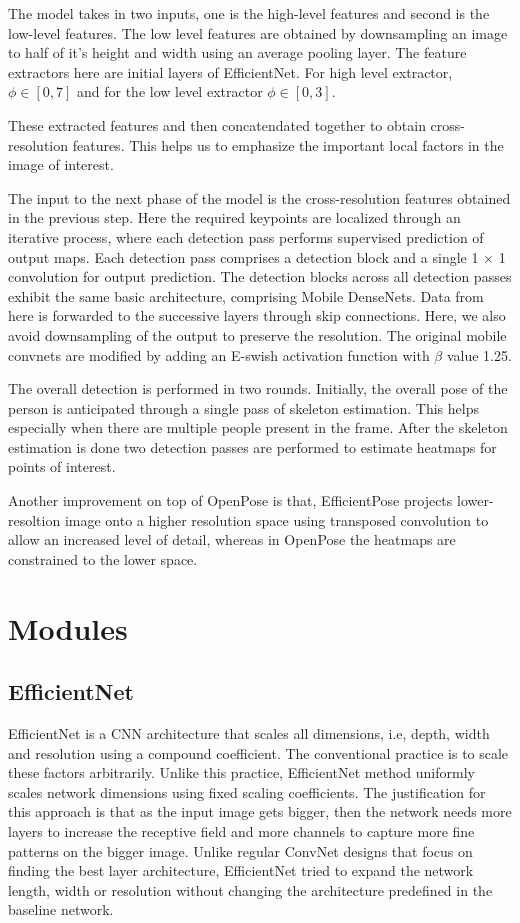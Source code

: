 \documentclass{fisatprojectfinal}
\begin{document}
The model takes in two inputs, one is the high-level features and second is the low-level features.
The low level features are obtained by downsampling an image to half of it's height and width using an average pooling layer.
The feature extractors here are initial layers of EfficientNet. For high level extractor, $\phi \in [0,7]$ and 
for the low level extractor $\phi \in [0,3]$.
\par
These extracted features and then concatendated together to obtain cross-resolution features.
This helps us to emphasize the important local factors in the image of interest.
\par
The input to the next phase of the model is the cross-resolution features obtained in the previous step.
Here the required keypoints are localized through an iterative process, where each
detection pass performs supervised prediction of output maps.
Each detection pass comprises a detection block
and a single 1 × 1 convolution for output prediction.
The detection blocks across all detection passes exhibit the
same basic architecture, comprising Mobile DenseNets.
Data from here is forwarded to the successive layers through skip connections.
Here, we also avoid downsampling of the output to preserve the resolution.
The original mobile convnets are modified by adding an E-swish activation function with $\beta$ value 1.25.
\par
The overall detection is performed in two rounds. Initially, the overall pose of the person is anticipated through a single pass of skeleton estimation. This helps especially when
there are multiple people present in the frame.
After the skeleton estimation is done two detection passes are performed to estimate heatmaps for points of interest.

\par
Another improvement on top of OpenPose is that, EfficientPose projects lower-resoltion image onto a higher resolution space using transposed convolution to allow an increased level of detail, whereas in OpenPose the heatmaps are
constrained to the lower space.
\section{Modules}
\subsection{EfficientNet}
EfficientNet \cite{Groos} is a CNN architecture that scales all dimensions, i.e, depth, width and resolution using a compound coefficient. The conventional practice is to scale these factors arbitrarily. Unlike this practice, EfficientNet method uniformly scales network dimensions using fixed scaling coefficients.  The justification for this approach is that as the input image gets bigger, then the network needs more layers to increase the receptive field and more channels to capture more fine patterns on the bigger image. Unlike regular ConvNet designs that focus on finding the best layer architecture, EfficientNet tried to expand the network length, width or resolution without changing the architecture predefined in the baseline network. 
\end{document}
